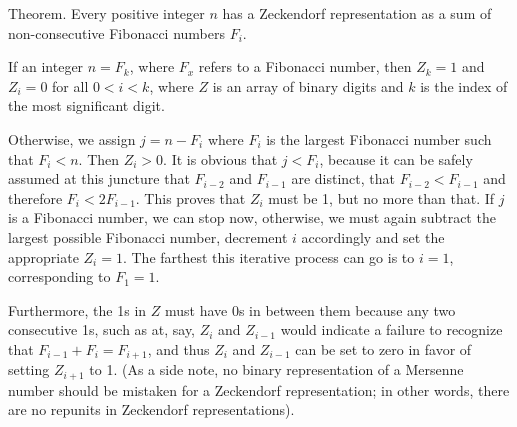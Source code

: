 \documentclass[12pt]{article}
\begin{document}
Theorem. Every positive integer $n$ has a Zeckendorf representation as a sum of non-consecutive Fibonacci numbers $F_i$.

If an integer $n = F_k$, where $F_x$ refers to a Fibonacci number, then $Z_k = 1$ and $Z_i = 0$ for all $0 < i < k$, where $Z$ is an array of binary digits and $k$ is the index of the most significant digit.

Otherwise, we assign $j = n - F_i$ where $F_i$ is the largest Fibonacci number such that $F_i < n$. Then $Z_i > 0$. It is obvious that $j < F_i$, because it can be safely assumed at this juncture that $F_{i - 2}$ and $F_{i - 1}$ are distinct, that $F_{i - 2} < F_{i - 1}$ and therefore $F_i < 2F_{i - 1}$. This proves that $Z_i$ must be 1, but no more than that. If $j$ is a Fibonacci number, we can stop now, otherwise, we must again subtract the largest possible Fibonacci number, decrement $i$ accordingly and set the appropriate $Z_i = 1$. The farthest this iterative process can go is to $i = 1$, corresponding to $F_1 = 1$.

Furthermore, the 1s in $Z$ must have 0s in between them because any two consecutive 1s, such as at, say, $Z_i$ and $Z_{i - 1}$ would indicate a failure to recognize that $F_{i - 1} + F_i = F_{i + 1}$, and thus $Z_i$ and $Z_{i - 1}$ can be set to zero in favor of setting $Z_{i + 1}$ to 1. (As a side note, no binary representation of a Mersenne number should be mistaken for a Zeckendorf representation; in other words, there are no repunits in Zeckendorf representations).
\end{document}
